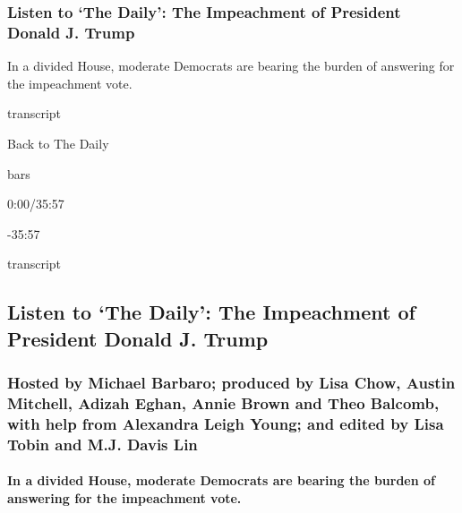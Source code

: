 \hypertarget{listen-to-the-daily-the-impeachment-of-president-donald-j-trump}{%
\subsubsection{Listen to `The Daily': The Impeachment of President
Donald J.
Trump}\label{listen-to-the-daily-the-impeachment-of-president-donald-j-trump}}

In a divided House, moderate Democrats are bearing the burden of
answering for the impeachment vote.

transcript

Back to The Daily

bars

0:00/35:57

-35:57

transcript

\hypertarget{listen-to-the-daily-the-impeachment-of-president-donald-j-trump-1}{%
\subsection{Listen to `The Daily': The Impeachment of President Donald
J.
Trump}\label{listen-to-the-daily-the-impeachment-of-president-donald-j-trump-1}}

\hypertarget{hosted-by-michael-barbaro-produced-by-lisa-chow-austin-mitchell-adizah-eghan-annie-brown-and-theo-balcomb-with-help-from-alexandra-leigh-young-and-edited-by-lisa-tobin-and-mj-davis-lin}{%
\subsubsection{Hosted by Michael Barbaro; produced by Lisa Chow, Austin
Mitchell, Adizah Eghan, Annie Brown and Theo Balcomb, with help from
Alexandra Leigh Young; and edited by Lisa Tobin and M.J. Davis
Lin}\label{hosted-by-michael-barbaro-produced-by-lisa-chow-austin-mitchell-adizah-eghan-annie-brown-and-theo-balcomb-with-help-from-alexandra-leigh-young-and-edited-by-lisa-tobin-and-mj-davis-lin}}

\hypertarget{in-a-divided-house-moderate-democrats-are-bearing-the-burden-of-answering-for-the-impeachment-vote}{%
\paragraph{In a divided House, moderate Democrats are bearing the burden
of answering for the impeachment
vote.}\label{in-a-divided-house-moderate-democrats-are-bearing-the-burden-of-answering-for-the-impeachment-vote}}


